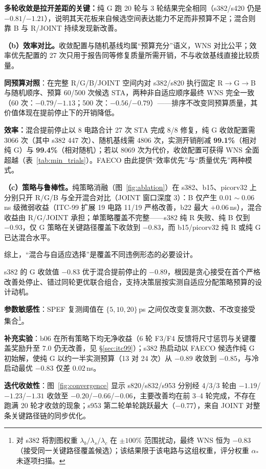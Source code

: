 \documentclass[journal]{IEEEtran}
\begin{document}
\textbf{多轮收敛是拉开差距的关键：}纯 G 跑 20 轮与 3 轮结果完全相同（s382/s420 仍是 $-0.81$/$-1.21$），说明其天花板来自候选空间表达能力不足而非预算不足；混合则靠 B 与 R/JOINT 持续发现新改善。

\textbf{（b）效率对比。}收敛配置与随机基线均属“预算充分”语义，WNS 对比公平；效率优先配置的 27 次只用于报告同等修复质量所需开销，不与收敛基线直接比较质量。

\textbf{同预算对照}：在完整 R/G/B/JOINT 空间内对 s382/s820 执行固定 R$\rightarrow$G$\rightarrow$B 与随机顺序、预算 60/500 次候选 STA，两种非自适应顺序最终 WNS 完全一致（60 次：$-0.79$/$-1.13$；500 次：$-0.56$/$-0.79$）——排序不改变同预算质量，其价值体现在提前停止下的开销降低。

\textbf{效率：}混合提前停止以 8 电路合计 27 次 STA 完成 8/8 修复，纯 G 收敛配置需 3066 次（其中 s382 447 次）、随机基线需 4806 次，实测开销削减 \textbf{99.1\%}（相对纯 G）与 \textbf{99.4\%}（相对随机）；若以 8069 次为代价，收敛配置可获得 WNS 全面超越（表~\ref{tab:min_trials}）。FAECO 由此提供“效率优先”与“质量优先”两种模式。

\textbf{（c）策略与鲁棒性。}纯策略消融（图~\ref{fig:ablation}）在 s382、b15、picorv32 上分别只开 R/G/B 与全开混合对比（JOINT 窗口深度 3）：B 仅产生 $0.01\!\sim\!0.06\,$ns 级微弱收益（ITC-99 扩展 19 电路 11/19 严格改善，b22 最大 $+0.06\,$ns），混合收益由 R/G/JOINT 承担；单策略覆盖不完整——s382 纯 R 失败、纯 B 仅到 $-0.93$，仅 G 策略在关键路径覆盖下收敛到 $-0.83$，而 b15/picorv32 纯 R 或纯 G 已达混合水平。

综上，“混合与自适应选择”是覆盖不同违例形态的必要设计。

s382 的 G 收敛值 $-0.83$ 优于混合提前停止的 $-0.89$，根因是贪心接受在首个严格改善处停止、错过同轮更优联合组合，支持决策层按实测自适应分配策略预算的设计动机。

\textbf{参数敏感性}：SPEF 复测阈值在 $\{5,10,20\}\,$ps 之间仅改变复测次数、不改变接受集合\footnote{对 s382 将割图权重 $\lambda_b/\lambda_s/\lambda_c$ 在 $\pm 100\%$ 范围扰动，最终 WNS 恒为 $-0.83$（接受同一关键路径覆盖候选）；该结果限于该电路与这组权重，评分权重 $\alpha_*$ 未逐项扫描。}。

\textbf{补充实验}：b06 在所有策略下均无净收益（6 轮 F3/F4 反馈将尺寸惩罚与关键覆盖奖励升至 $7.0$ 仍无改善，见 \S\ref{sec:itc99}）；s382 热启动以 FAECO 候选作纯 G 初始解，使纯 G 以约一半实测预算（13 对 24 次）从 $-0.89$ 收敛到 $-0.85$，与冷启动最优 $-0.83$ 仅差 $0.02\,$ns。

\textbf{迭代收敛性}：图~\ref{fig:convergence} 显示 s820/s832/s953 分别经 4/3/3 轮由 $-1.19$/$-1.23$/$-1.31$ 收敛至 $-0.20$/$-0.66$/$-0.06$，主要改善均在前 3--4 轮完成，不存在跑满 20 轮才收敛的现象；s953 第二轮单轮跳跃最大（$-0.77$），来自 JOINT 对整条关键路径链的同步优化。
\end{document}
